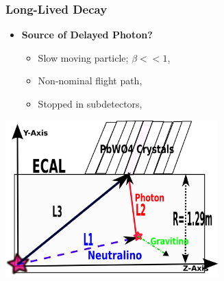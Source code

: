 \documentclass{beamer}
\begin{document}
\begin{frame}
\frametitle{\huge {Long-Lived Decay}}
\begin{minipage}[t]{0.5\paperwidth}
   \begin{itemize}
    \item \textcolor{UMN@Maroon}{\textbf{Source of Delayed Photon?}}
     \begin{itemize}
      \item Slow moving particle; $\beta << 1$,
      \item Non-nominal flight path,
      \item Stopped in subdetectors,
     \end{itemize}
      
 \end{itemize}  
\end{minipage}

\begin{minipage}[t]{0.7\paperwidth}
\centering
   \includegraphics[height=6cm, width=0.8\paperwidth]{THESISPLOTS/DelayedPhoton-ECAL.png}
\end{minipage}
\end{frame}
\end{document}
